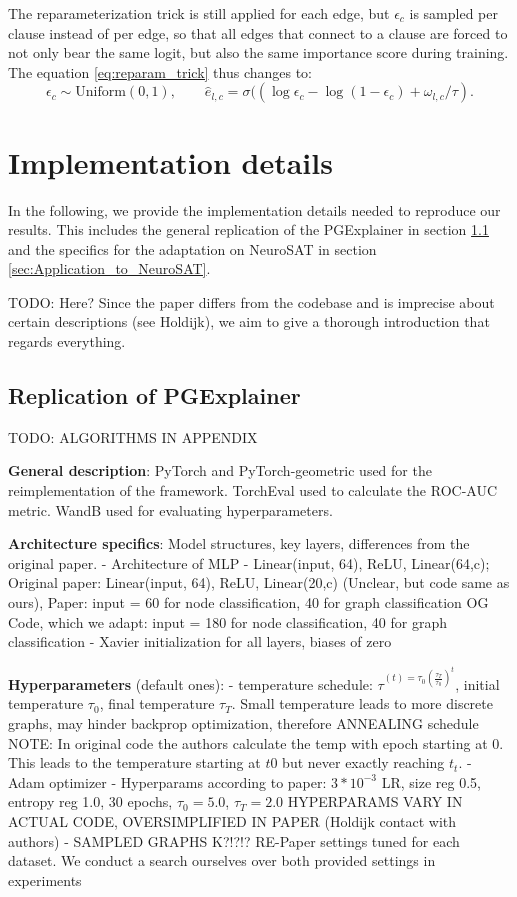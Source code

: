 The reparameterization trick is still applied for each edge, but $\epsilon_c$ is sampled per clause instead of per edge, so that all edges that connect to a clause are forced to not only bear the same logit, but also the same importance score during training. The equation \ref{eq:reparam_trick} thus changes to:
\begin{equation}
    \epsilon_c \sim \text{Uniform}(0,1), \qquad \hat{e}_{l,c}=\sigma((\log \epsilon_c - \log(1-\epsilon_c)+\omega_{l,c}/\tau).
\end{equation}


\section{Implementation details}
In the following, we provide the implementation details needed to reproduce our results. This includes the general replication of the PGExplainer in section \ref{sec:Replication_of_PGExplainer} and the specifics for the adaptation on NeuroSAT in section \ref{sec:Application_to_NeuroSAT}.

TODO: Here? Since the paper differs from the codebase and is imprecise about certain descriptions (see Holdijk), we aim to give a thorough introduction that regards everything.


\subsection{Replication of PGExplainer}
\label{sec:Replication_of_PGExplainer}

TODO: ALGORITHMS IN APPENDIX

\textbf{General description}: PyTorch and PyTorch-geometric used for the reimplementation of the framework. TorchEval used to calculate the ROC-AUC metric. WandB used for evaluating hyperparameters. 

\textbf{Architecture specifics}: Model structures, key layers, differences from the original paper.
- Architecture of MLP - Linear(input, 64), ReLU, Linear(64,c);
 Original paper: Linear(input, 64), ReLU, Linear(20,c) (Unclear, but code same as ours), Paper: input = 60 for node classification, 40 for graph classification
 OG Code, which we adapt: input = 180 for node classification, 40 for graph classification
 - Xavier initialization for all layers, biases of zero

\textbf{Hyperparameters} (default ones):
- temperature schedule: $\tau^{(t) = \tau_0(\frac{\tau_T}{\tau_0})^t}$, initial temperature $\tau_0$, final temperature $\tau_T$. Small temperature leads to more discrete graphs, may hinder backprop optimization, therefore ANNEALING schedule
NOTE: In original code the authors calculate the temp with epoch starting at 0. This leads to the temperature starting at $t0$ but never exactly reaching $t_t$.
- Adam optimizer
- Hyperparams according to paper: $3*10^{-3}$ LR, size reg 0.5, entropy reg 1.0, 30 epochs, $\tau_0 = 5.0$, $\tau_T = 2.0$ HYPERPARAMS VARY IN ACTUAL CODE, OVERSIMPLIFIED IN PAPER (Holdijk contact with authors)
- SAMPLED GRAPHS K?!?!?
RE-Paper settings tuned for each dataset. We conduct a search ourselves over both provided settings in experiments

